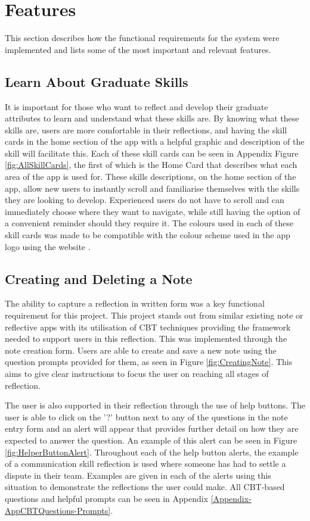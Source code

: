 \documentclass{l4proj}
\begin{document}
\section{Features}

This section describes how the functional requirements for the system were implemented and lists some of the most important and relevant features. 

\subsection{Learn About Graduate Skills}

It is important for those who want to reflect and develop their graduate attributes to learn and understand what these skills are. By knowing what these skills are, users are more comfortable in their reflections, and having the skill cards in the home section of the app with a helpful graphic and description of the skill will facilitate this. Each of these skill cards can be seen in Appendix Figure \ref{fig:AllSkillCards}, the first of which is the Home Card that describes what each area of the app is used for. These skills descriptions, on the home section of the app, allow new users to instantly scroll and familiarise themselves with the skills they are looking to develop. Experienced users do not have to scroll and can immediately choose where they want to navigate, while still having the option of a convenient reminder should they require it. The colours used in each of these skill cards was made to be compatible with the colour scheme used in the app logo using the website \citet{coolersco_coolors_2021}.

\subsection{Creating and Deleting a Note}

The ability to capture a reflection in written form was a key functional requirement for this project. This project stands out from similar existing note or reflective apps with its utilisation of CBT techniques providing the framework needed to support users in this reflection. This was implemented through the note creation form. Users are able to create and save a new note using the question prompts provided for them, as seen in Figure \ref{fig:CreatingNote}. This aims to give clear instructions to focus the user on reaching all stages of reflection. 

The user is also supported in their reflection through the use of help buttons. The user is able to click on the '?' button next to any of the questions in the note entry form and an alert will appear that provides further detail on how they are expected to answer the question. An example of this alert can be seen in Figure \ref{fig:HelperButtonAlert}. Throughout each of the help button alerts, the example of a communication skill reflection is used where someone has had to settle a dispute in their team. Examples are given in each of the alerts using this situation to demonstrate the reflections the user could make. All CBT-based questions and helpful prompts can be seen in Appendix \ref{Appendix-AppCBTQuestions-Prompts}.
\end{document}
